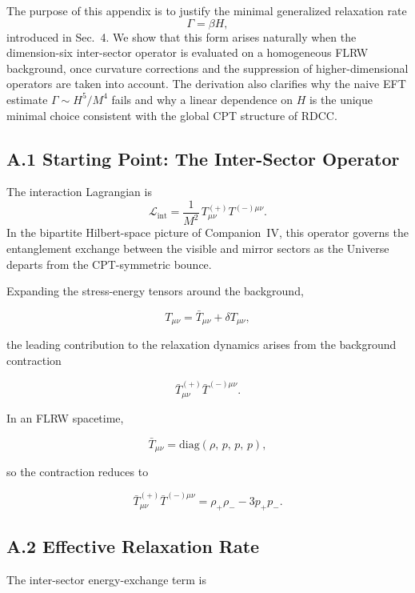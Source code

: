 \documentclass[11pt,a4paper]{article}
\begin{document}
The purpose of this appendix is to justify the minimal generalized relaxation rate
\begin{equation}
    \Gamma = \beta H,
\end{equation}
introduced in Sec.~4. We show that this form arises naturally when the dimension-six
inter-sector operator is evaluated on a homogeneous FLRW background, once curvature
corrections and the suppression of higher-dimensional operators are taken into account.
The derivation also clarifies why the naive EFT estimate $\Gamma \sim H^5/M^4$ fails and
why a linear dependence on $H$ is the unique minimal choice consistent with the global
CPT structure of RDCC.

\subsection*{A.1 Starting Point: The Inter-Sector Operator}

The interaction Lagrangian is
\begin{equation}
    \mathcal{L}_{\mathrm{int}}
    = \frac{1}{M^2}\,
      T^{(+)}_{\mu\nu} T^{(-)\mu\nu}.
    \label{eq:A1}
\end{equation}
In the bipartite Hilbert-space picture of Companion~IV, this operator governs the
entanglement exchange between the visible and mirror sectors as the Universe departs
from the CPT-symmetric bounce.

Expanding the stress-energy tensors around the background,


\[
    T_{\mu\nu} = \bar{T}_{\mu\nu} + \delta T_{\mu\nu},
\]


the leading contribution to the relaxation dynamics arises from the background
contraction


\[
    \bar{T}^{(+)}_{\mu\nu} \bar{T}^{(-)\mu\nu}.
\]



In an FLRW spacetime,


\[
    \bar{T}_{\mu\nu} = \mathrm{diag}(\rho,\, p,\, p,\, p),
\]


so the contraction reduces to


\[
    \bar{T}^{(+)}_{\mu\nu} \bar{T}^{(-)\mu\nu}
    = \rho_+ \rho_- - 3 p_+ p_-.
\]



\subsection*{A.2 Effective Relaxation Rate}

The inter-sector energy-exchange term is
\end{document}
